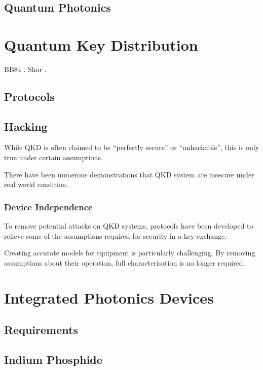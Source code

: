 \subsection{Quantum Photonics}

\section{Quantum Key Distribution}

BB84 \cite{BB84}. Shor \cite{shor1994}.

\subsection{Protocols}

\subsection{Hacking}

While \ac{QKD} is often claimed to be ``perfectly secure'' or ``unhackable'', this is only true under certain assumptions. 

There have been numerous demonstrations that \ac{QKD} system are insecure under real world condition.

\subsubsection*{Device Independence}

To remove potential attacks on \ac{QKD} systems, protocols have been developed to relieve some of the assumptions required for security in a key exchange. 

Creating accurate models for equipment is particularly challenging. By removing assumptions about their operation, full characterisation is no longer required.

\section{Integrated Photonics Devices}

\subsection{Requirements}

\subsection{Indium Phosphide}

